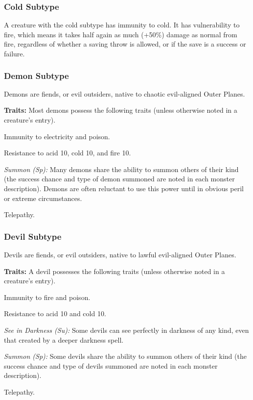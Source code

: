 \subsubsection{Cold Subtype}
A creature with the cold subtype has immunity to cold. It has vulnerability to fire, which means it takes half again as much (+50\%) damage as normal from fire, regardless of whether a saving throw is allowed, or if the save is a success or failure.

\subsubsection{Demon Subtype}
Demons are fiends, or evil outsiders, native to chaotic evil-aligned Outer Planes.

\textbf{Traits:} Most demons possess the following traits (unless otherwise noted in a creature's entry).
\begin{itemize*}
\item Immunity to electricity and poison.
\item Resistance to acid 10, cold 10, and fire 10.
\item \textit{Summon (Sp):} Many demons share the ability to summon others of their kind (the success chance and type of demon summoned are noted in each monster description). Demons are often reluctant to use this power until in obvious peril or extreme circumstances.
\item Telepathy.
\end{itemize*}

\subsubsection{Devil Subtype}
Devils are fiends, or evil outsiders, native to lawful evil-aligned Outer Planes.

\textbf{Traits:} A devil possesses the following traits (unless otherwise noted in a creature's entry).
\begin{itemize*}
\item Immunity to fire and poison.
\item Resistance to acid 10 and cold 10.
\item \textit{See in Darkness (Su):} Some devils can see perfectly in darkness of any kind, even that created by a deeper darkness spell.
\item \textit{Summon (Sp):} Some devils share the ability to summon others of their kind (the success chance and type of devils summoned are noted in each monster description).
\item Telepathy.
\end{itemize*}


